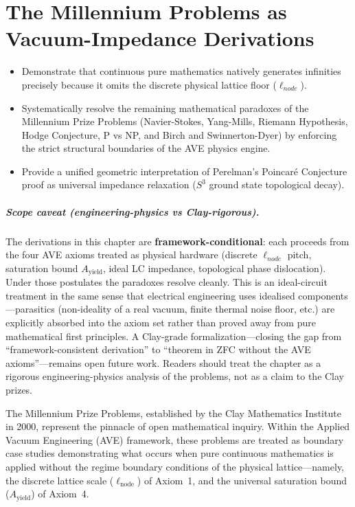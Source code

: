 \chapter{The Millennium Problems as Vacuum-Impedance Derivations}
\label{ch:millennium_prizes}

\begin{objectivebox}
\begin{itemize}
    \item Demonstrate that continuous pure mathematics natively generates infinities precisely because it omits the discrete physical lattice floor ($\ell_{node}$).
    \item Systematically resolve the remaining mathematical paradoxes of the Millennium Prize Problems (Navier-Stokes, Yang-Mills, Riemann Hypothesis, Hodge Conjecture, P vs NP, and Birch and Swinnerton-Dyer) by enforcing the strict structural boundaries of the AVE physics engine.
    \item Provide a unified geometric interpretation of Perelman's Poincar\'e Conjecture proof as universal impedance relaxation ($S^3$ ground state topological decay).
\end{itemize}
\end{objectivebox}

\paragraph{Scope caveat (engineering-physics vs Clay-rigorous).}
The derivations in this chapter are \textbf{framework-conditional}: each proceeds from the four AVE axioms treated as physical hardware (discrete $\ell_{node}$ pitch, saturation bound $A_{\text{yield}}$, ideal LC impedance, topological phase dislocation). Under those postulates the paradoxes resolve cleanly. This is an ideal-circuit treatment in the same sense that electrical engineering uses idealised components---parasitics (non-ideality of a real vacuum, finite thermal noise floor, etc.) are explicitly absorbed into the axiom set rather than proved away from pure mathematical first principles. A Clay-grade formalization---closing the gap from ``framework-consistent derivation'' to ``theorem in ZFC without the AVE axioms''---remains open future work. Readers should treat the chapter as a rigorous engineering-physics analysis of the problems, not as a claim to the Clay prizes.

\vspace{6pt}

The Millennium Prize Problems, established by the Clay Mathematics Institute in 2000, represent the pinnacle of open mathematical inquiry. Within the Applied Vacuum Engineering (AVE) framework, these problems are treated as boundary case studies demonstrating what occurs when pure continuous mathematics is applied without the regime boundary conditions of the physical lattice---namely, the discrete lattice scale ($\ell_\mathrm{node}$) of Axiom~1, and the universal saturation bound ($A_\mathrm{yield}$) of Axiom~4.

